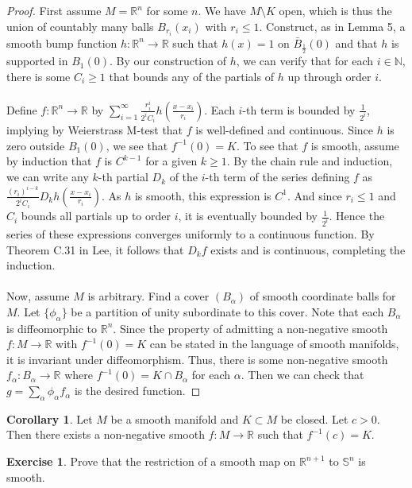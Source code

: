 \documentclass[10pt,letterpaper,cm]{nupset}
\theoremstyle{definition}
\newtheorem{corollary}{Corollary}
\newtheorem{exercise}{Exercise}
\newcommand{\N}{\mathbb N}
\newcommand{\R}{\mathbb R}
\renewcommand{\S}{\mathbb S}
\newcommand{\1}{\mathbf{1}}
\newcommand{\0}{\vec 0}
\begin{document}
\begin{proof}
First assume $M=\R^n$ for some $n$. We have $M\setminus K$ open, which is thus the union of countably many balls $B_{r_i}(x_i)$ with $r_i \leq 1$. Construct, as in Lemma 5, a smooth bump function $h: \R^n \to \R$ such that
 $h(x) =1$ on $\bar{B}_{\frac{1}{2}}(0)$ and that $h$ is supported in $B_1(0)$.  By our construction of $h$, we can verify that for each $i\in \N$, there is some $C_i \geq 1$ that bounds any of the partials of $h$ up through order $i$. 
 \\ \\ Define $f: \R^n \to \R$ by $\sum_{i=1}^\infty \frac{r_i^i}{2^iC_i}h (\frac{x-x_i}{r_i})$. Each $i$-th term is bounded by $\frac{1}{2^i}$, implying by Weierstrass M-test that $f$ is well-defined and continuous. Since $h$ is zero outside $B_1(0)$, we see that $f^{-1}(0) = K$. To see that $f$ is smooth, assume by induction that $f$ is $C^{k-1}$ for a given $k \geq 1$. By the chain rule and induction, we can write any $k$-th partial $D_k$ of the $i$-th term of the series defining $f$ as $\frac{(r_i)^{i-k}}{2^iC_i} D_kh(\frac{x-x_i}{r_i})$. As $h$ is smooth, this expression is $C^1$. And since $r_i \leq 1$ and $C_i$ bounds all partials up to order $i$, it is eventually bounded by $\frac{1}{2^i}$. Hence the series of these expressions converges uniformly to a continuous function. By Theorem C.31 in Lee, it follows that $D_kf$ exists and is continuous, completing the induction. 
\\ \\ Now, assume $M$ is arbitrary. Find a cover $(B_\alpha)$ of smooth coordinate balls for $M$. Let $\{\phi_\alpha\}$ be a partition of unity subordinate to this cover. Note that each $B_\alpha$ is diffeomorphic to $\R^n$. Since the property of admitting a non-negative smooth $f: M \to \R$ with $f^{-1}(0) = K$ can be stated in the language of smooth manifolds, it is invariant under diffeomorphism. Thus, there is some non-negative smooth $f_\alpha : B_\alpha \to \R$ where $f^{-1}(0) = K \cap B_\alpha$ for each $\alpha$. Then we can check that $g = \sum_{\alpha} \phi_\alpha f_\alpha$ is the desired function.
\end{proof}

\begin{corollary}
Let $M$ be a smooth manifold and $K \subset M$ be closed. Let $c >0$. Then there exists a non-negative smooth $f: M \to \R$ such that $f^{-1}(c) =K$.
\end{corollary}

\begin{exercise}
Prove that the restriction of a smooth map on $\R^{n+1}$ to $\S^n$ is smooth. 
\end{exercise}
\end{document}

